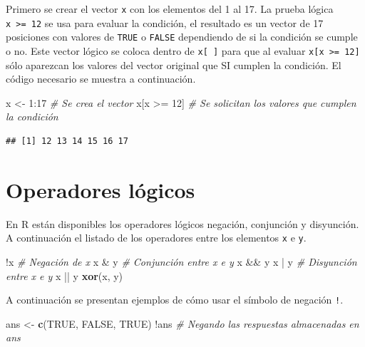 \documentclass[10pt,]{krantz}
\makeatletter
\newenvironment{Shaded}{\begin{snugshade}}{\end{snugshade}}
\newcommand{\KeywordTok}[1]{\textcolor[rgb]{0.13,0.29,0.53}{\textbf{{#1}}}}
\newcommand{\DecValTok}[1]{\textcolor[rgb]{0.00,0.00,0.81}{{#1}}}
\newcommand{\StringTok}[1]{\textcolor[rgb]{0.31,0.60,0.02}{{#1}}}
\newcommand{\CommentTok}[1]{\textcolor[rgb]{0.56,0.35,0.01}{\textit{{#1}}}}
\newcommand{\OtherTok}[1]{\textcolor[rgb]{0.56,0.35,0.01}{{#1}}}
\newcommand{\NormalTok}[1]{{#1}}
\let\proglang=\textsf
\newenvironment{kframe}{%
\medskip{}
\setlength{\fboxsep}{.8em}
 \def\at@end@of@kframe{}%
 \ifinner\ifhmode%
  \def\at@end@of@kframe{\end{minipage}}%
  \begin{minipage}{\columnwidth}%
 \fi\fi%
 \def\FrameCommand##1{\hskip\@totalleftmargin \hskip-\fboxsep
 \colorbox{shadecolor}{##1}\hskip-\fboxsep
     \hskip-\linewidth \hskip-\@totalleftmargin \hskip\columnwidth}%
 \MakeFramed {\advance\hsize-\width
   \@totalleftmargin\z@ \linewidth\hsize
   \@setminipage}}%
 {\par\unskip\endMakeFramed%
 \at@end@of@kframe}
\renewenvironment{Shaded}{\begin{kframe}}{\end{kframe}}
\makeatother
\begin{document}
Primero se crear el vector \texttt{x} con los elementos del 1 al 17. La
prueba lógica \texttt{x\ \textgreater{}=\ 12} se usa para evaluar la
condición, el resultado es un vector de 17 posiciones con valores de
\texttt{TRUE} o \texttt{FALSE} dependiendo de si la condición se cumple
o no. Este vector lógico se coloca dentro de \texttt{x{[}\ {]}} para que
al evaluar \texttt{x{[}x\ \textgreater{}=\ 12{]}} sólo aparezcan los
valores del vector original que SI cumplen la condición. El código
necesario se muestra a continuación.

\begin{Shaded}
\begin{Highlighting}[]
\NormalTok{x <-}\StringTok{ }\DecValTok{1}\NormalTok{:}\DecValTok{17}  \CommentTok{# Se crea el vector}
\NormalTok{x[x >=}\StringTok{ }\DecValTok{12}\NormalTok{]  }\CommentTok{# Se solicitan los valores que cumplen la condición}
\end{Highlighting}
\end{Shaded}

\begin{verbatim}
## [1] 12 13 14 15 16 17
\end{verbatim}

\section{\texorpdfstring{Operadores lógicos
}{Operadores lógicos }}\label{operadores-logicos}

En \proglang{R} están disponibles los operadores lógicos negación,
conjunción y disyunción. A continuación el listado de los operadores
entre los elementos \texttt{x} e \texttt{y}.

\begin{Shaded}
\begin{Highlighting}[]
\NormalTok{!x  }\CommentTok{# Negación de x}
\NormalTok{x &}\StringTok{ }\NormalTok{y  }\CommentTok{# Conjunción entre x e y}
\NormalTok{x &&}\StringTok{ }\NormalTok{y}
\NormalTok{x |}\StringTok{ }\NormalTok{y  }\CommentTok{# Disyunción entre x e y}
\NormalTok{x ||}\StringTok{ }\NormalTok{y}
\KeywordTok{xor}\NormalTok{(x, y)}
\end{Highlighting}
\end{Shaded}

A continuación se presentan ejemplos de cómo usar el símbolo de negación
\texttt{!}.

\begin{Shaded}
\begin{Highlighting}[]
\NormalTok{ans <-}\StringTok{ }\KeywordTok{c}\NormalTok{(}\OtherTok{TRUE}\NormalTok{, }\OtherTok{FALSE}\NormalTok{, }\OtherTok{TRUE}\NormalTok{)}
\NormalTok{!ans  }\CommentTok{# Negando las respuestas almacenadas en ans}
\end{Highlighting}
\end{Shaded}
\end{document}
